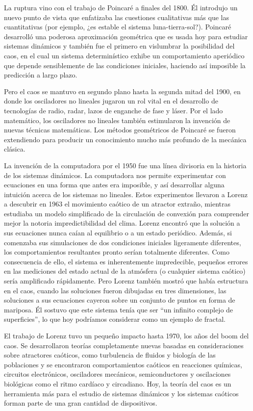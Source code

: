 La ruptura vino con el trabajo de Poincaré a finales del 1800.
Él introdujo un nuevo punto de vista que enfatizaba las cuestiones cualitativas más que las cuantitativas (por ejemplo, ¿es estable el sistema luna-tierra-sol?).
Poincaré desarrolló una poderosa aproximación geométrica que es usada hoy para estudiar sistemas dinámicos y también fue el primero en vislumbrar la posibilidad del caos, en el cual un sistema determinístico exhibe un comportamiento aperiódico que depende sensiblemente de las condiciones iniciales, haciendo así imposible la predicción a largo plazo.

Pero el caos se mantuvo en segundo plano hasta la segunda mitad del 1900, en donde los osciladores no lineales jugaron un rol vital en el desarrollo de tecnologías de radio, radar, lazos de enganche de fase y láser.
Por el lado matemático, los osciladores no lineales también estimularon la invención de nuevas técnicas matemáticas.
Los métodos geométricos de Poincaré se fueron extendiendo para producir un conocimiento mucho más profundo de la mecánica clásica.

La invención de la computadora por el 1950 fue una línea divisoria en la historia de los sistemas dinámicos.
La computadora nos permite experimentar con ecuaciones en una forma que antes era imposible, y así desarrollar alguna intuición acerca de los sistemas no lineales.
Estos experimentos llevaron a Lorenz a descubrir en 1963 el movimiento caótico de un atractor extraño, mientras estudiaba un modelo simplificado de la circulación de convexión para comprender mejor la notoria impredictibilidad del clima.
Lorenz encontró que la solución a sus ecuaciones nunca caían al equilibrio o a un estado periódico.
Además, si comenzaba sus simulaciones de dos condiciones iniciales ligeramente diferentes, los comportamientos resultantes pronto serían
totalmente diferentes.
Como consecuencia de ello, el sistema es inherentemente impredecible, pequeños errores en las mediciones del estado actual de la atmósfera (o cualquier sistema caótico) sería amplificado rápidamente.
Pero Lorenz también mostró que había estructura en el caos, cuando las soluciones fueron dibujadas en tres dimensiones, las soluciones a sus ecuaciones cayeron sobre un conjunto de puntos en forma de mariposa.
Él sostuvo que este sistema tenía que ser “un infinito complejo de superficies”, lo que hoy podríamos considerar como un ejemplo de fractal.

El trabajo de Lorenz tuvo un pequeño impacto hasta 1970, los años del boom del caos.
Se desarrollaron teorías completamente nuevas basadas en consideraciones sobre atractores caóticos, como turbulencia de fluidos y biología de las poblaciones y se encontraron comportamientos caóticos en reacciones químicas, circuitos electrónicos, osciladores mecánicos, semiconductores y oscilaciones biológicas como el ritmo cardíaco y circadiano.
Hoy, la teoría del caos es un herramienta más para el estudio de sistemas dinámicos y los sistemas caóticos forman parte de una gran cantidad de dispositivos.

